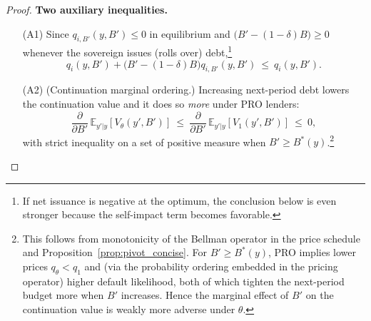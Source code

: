 \documentclass[12pt]{article}
\theoremstyle{plain}
\newcommand{\E}{\mathbb{E}}
\begin{document}
\begin{proof}
	\medskip
	\textbf{Two auxiliary inequalities.}
	\begin{enumerate}
		\item[(A1)] Since \(q_{i,B'}(y,B')\le 0\) in equilibrium and \(\big(B'-(1-\delta)B\big)\ge 0\) whenever the sovereign issues (rolls over) debt,\footnote{If net issuance is negative at the optimum, the conclusion below is even stronger because the self-impact term becomes favorable.}
		      \begin{equation}\label{eq:dcdb_lower}
			      q_i(y,B')+\big(B'-(1-\delta)B\big)q_{i,B'}(y,B')\ \le\ q_i(y,B').
		      \end{equation}

		\item[(A2)] (Continuation marginal ordering.) Increasing next-period debt lowers the continuation value and it does so \emph{more} under PRO lenders:
		      \begin{equation}\label{eq:cont_deriv_order}
			      \frac{\partial}{\partial B'}\,\E_{y'|y}[V_\theta(y',B')] \ \le\ \frac{\partial}{\partial B'}\,\E_{y'|y}[V_1(y',B')]
			      \ \le\ 0,
		      \end{equation}
		      with strict inequality on a set of positive measure when \(B'\ge B^*(y)\).\footnote{This follows from monotonicity of the Bellman operator in the price schedule and Proposition~\ref{prop:pivot_concise}. For \(B'\ge B^*(y)\), PRO implies lower prices \(q_\theta<q_1\) and (via the probability ordering embedded in the pricing operator) higher default likelihood, both of which tighten the next-period budget more when \(B'\) increases. Hence the marginal effect of \(B'\) on the continuation value is weakly more adverse under \(\theta\).}
	\end{enumerate}


\end{proof}
\end{document}
